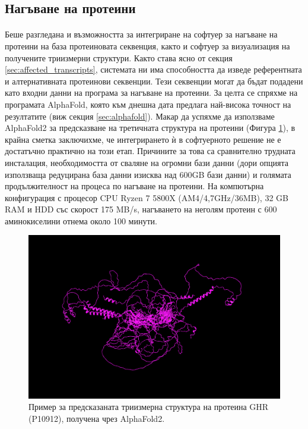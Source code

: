 \documentclass[pdftex,cyrillic,14pt,a4page,twoside,openright]{extreport}
\begin{document}
\subsection{Нагъване на протеини}
\paragraph{}
Беше разгледана и възможността за интегриране на софтуер за нагъване на протеини на база протеиновата секвенция, както и софтуер за визуализация на получените триизмерни структури. Както става ясно от секция \ref{sec:affected_transcripts}, системата ни има способността да изведе референтната и алтернативната протеинови секвенции. Тези секвенции могат да бъдат подадени като входни данни на програма за нагъване на протеини. За целта се спряхме на програмата AlphaFold, която към днешна дата предлага най-висока точност на резултатите (виж секция \ref{sec:alphafold}). Макар да успяхме да използваме AlphaFold2 за предсказване на третичната структура на протеини (Фигура \ref{fig:folded_protein}), в крайна сметка заключихме, че интегрирането ѝ в софтуерното решение не е достатъчно практично на този етап. Причините за това са сравнително трудната инсталация, необходимостта от сваляне на огромни бази данни (дори опцията използваща редуцирана база данни изисква над 600GB бази данни) и голямата продължителност на процеса по нагъване на протеини. На компютърна конфигурация с процесор CPU Ryzen 7 5800X (AM4/4,7GHz/36MB), 32 GB RAM и HDD със скорост 175 MB/s, нагъването на неголям протеин с 600 аминокиселини отнема около 100 минути.

\begin{figure}[h]
  \centering
  \includegraphics[width=16cm]{figures/folded_protein}
  \caption {Пример за предсказаната триизмерна структура на протеина GHR (P10912), получена чрез AlphaFold2.}
  \label{fig:folded_protein}
\end{figure}
\end{document}
